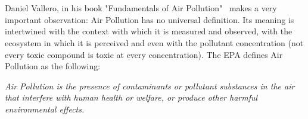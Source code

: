 

\section{}%
\label{sec:ap}

Daniel Vallero, in his book "Fundamentals of Air
Pollution"~\cite{Vallero2014} makes a very important observation: Air
Pollution has no universal definition. Its meaning is intertwined with
the context with which it is measured and observed, with the ecosystem
in which it is perceived and even with the pollutant concentration (not
every toxic compound is toxic at every concentration). The \gls{EPA}
defines Air Pollution as the following:

\begin{center}
    \begin{minipage}{0.8\textwidth}

        \noindent \textit{Air Pollution is the presence of contaminants
        or pollutant substances in the air that interfere with human
        health or welfare, or produce other harmful environmental effects.}

    \end{minipage}
\end{center}

